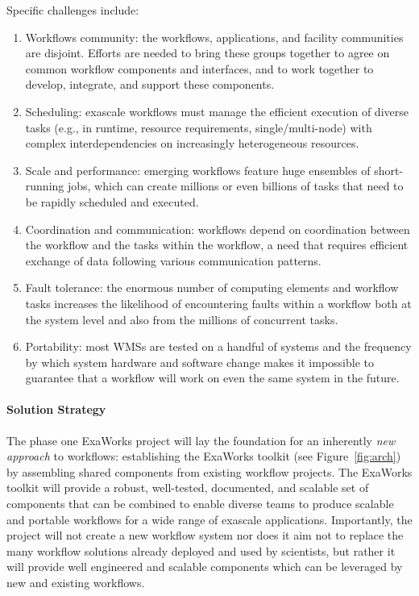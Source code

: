 Specific challenges include: 
\begin{enumerate}
    \item Workflows community: the workflows, applications, and facility communities are disjoint. Efforts are needed to bring these groups together to agree on common workflow components and interfaces, and to work together to develop, integrate, and support these components.
    \item Scheduling: exascale workflows must manage the efficient execution of diverse
    tasks (e.g., in runtime, resource requirements, single/multi-node) with complex interdependencies on increasingly heterogeneous resources. 
    \item Scale and performance: emerging workflows feature huge ensembles of short-running jobs, which can create millions or even billions of tasks that need to be rapidly scheduled and executed.
    \item Coordination and communication: workflows depend on coordination between the workflow and the tasks within the workflow, a need that requires efficient exchange of data following various communication patterns.
    \item Fault tolerance: the enormous number of computing elements and workflow tasks increases the likelihood of encountering faults within a workflow both at the system level and also from the millions of concurrent tasks. 
    \item Portability: most WMSs are tested on a handful of systems and the frequency by which system hardware and software change makes it impossible to guarantee that a workflow will work on even the same system in the future.
\end{enumerate}

\paragraph{Solution Strategy}
The phase one ExaWorks project will lay the foundation for an inherently
\textit{new approach} to workflows: establishing the ExaWorks toolkit (see
Figure~\ref{fig:arch}) by assembling shared components from existing workflow
projects. The ExaWorks toolkit will provide a robust, well-tested, documented,
and scalable set of components that can be combined to enable diverse teams to
produce scalable and portable workflows for a wide range of exascale
applications. Importantly, the project will not create a new workflow system
nor does it aim not to replace the many workflow solutions already deployed
and used by scientists, but rather it will provide well engineered and
scalable components which can be leveraged by new and existing workflows.


